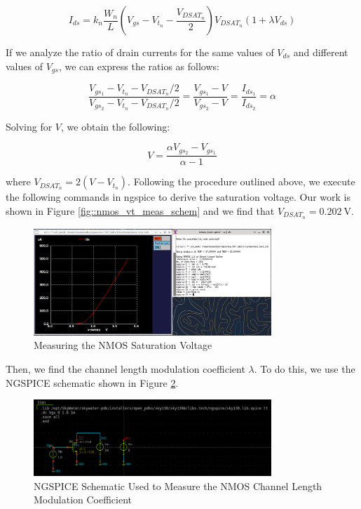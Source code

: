 \documentclass[fleqn]{article}
\begin{document}
	\begin{equation}
		\label{eq::nmos_sat_current}
		I_{ds} = k_n\frac{W_n}{L}\left(V_{gs} - V_{t_n} - \frac{V_{DSAT_n}}{2}\right)V_{DSAT_n}(1 + {\lambda}V_{ds})
	\end{equation}
	
	\noindent If we analyze the ratio of drain currents for the same values of $V_{ds}$ and different values of $V_{gs}$, we can express the ratios as follows:
	
	\begin{equation}
		\frac{V_{gs_1} - V_{t_n} - V_{DSAT_n}/2}{V_{gs_2} - V_{t_n} - V_{DSAT_n}/2} = \frac{V_{gs_1} - V}{V_{gs_2} - V} = \frac{I_{ds_1}}{I_{ds_2}} = \alpha
	\end{equation}
	
	\noindent Solving for $V$, we obtain the following:
	
	\begin{equation}
		V = \frac{{\alpha}V_{gs_2} - V_{gs_1}}{\alpha - 1}
	\end{equation}
	
	\noindent where $V_{DSAT_n} = 2(V - V_{t_n})$. Following the procedure outlined above, we execute the following commands in ngspice to derive the saturation voltage. Our work is shown in Figure \ref{fig::nmos_vt_meas_schem} and we find that $V_{DSAT_n} = 0.202\ \text{V}$.
	
	\begin{figure}[H]
		\centerline{\includegraphics[width=0.8\textwidth]{nmos_vdsat_meas.png}}
		\caption{Measuring the NMOS Saturation Voltage}
		\label{fig::nmos_vdsat_meas}
	\end{figure}
	
	Then, we find the channel length modulation coefficient $\lambda$. To do this, we use the NGSPICE schematic shown in Figure \ref{fig::nmos_lambda_meas_schem}.
	
	\begin{figure}[H]
		\centerline{\includegraphics[width=0.8\textwidth]{nmos_vt_meas_schem.png}}
		\caption{NGSPICE Schematic Used to Measure the NMOS Channel Length Modulation Coefficient}
		\label{fig::nmos_lambda_meas_schem}
	\end{figure}
	
\end{document}

